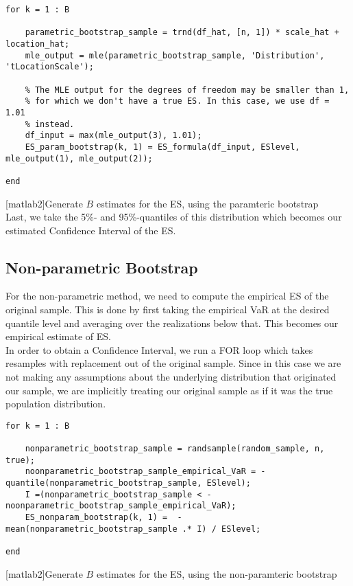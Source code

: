 \documentclass[11pt, a4paper]{article}
\begin{document}
\begin{lstlisting}[style=Matlab-editor]
for k = 1 : B

	parametric_bootstrap_sample = trnd(df_hat, [n, 1]) * scale_hat + location_hat;
	mle_output = mle(parametric_bootstrap_sample, 'Distribution', 'tLocationScale');
	
	% The MLE output for the degrees of freedom may be smaller than 1,     
	% for which we don't have a true ES. In this case, we use df = 1.01
	% instead.
	df_input = max(mle_output(3), 1.01);                                        
	ES_param_bootstrap(k, 1) = ES_formula(df_input, ESlevel, mle_output(1), mle_output(2));

end
\end{lstlisting}
\label{Parametric Bootstrap repetition}
[matlab2]{Generate $B$ estimates for the ES, using the paramteric bootstrap\\}
Last, we take the 5\%- and 95\%-quantiles of this distribution which becomes our estimated Confidence Interval of the ES.

\subsection{Non-parametric Bootstrap}

For the non-parametric method, we need to compute the empirical ES of the original sample. This is done by first taking the empirical VaR at the desired quantile level and averaging over the realizations below that. This becomes our empirical estimate of ES.\\

In order to obtain a Confidence Interval, we run a FOR loop which takes resamples with replacement out of the original sample. Since in this case we are not making any assumptions about the underlying distribution that originated our sample, we are implicitly treating our original sample as if it was the true population distribution.\\

\begin{lstlisting}[style=Matlab-editor]
for k = 1 : B

	nonparametric_bootstrap_sample = randsample(random_sample, n, true);
	noonparametric_bootstrap_sample_empirical_VaR = - quantile(nonparametric_bootstrap_sample, ESlevel);
	I =(nonparametric_bootstrap_sample < - noonparametric_bootstrap_sample_empirical_VaR);
	ES_nonparam_bootstrap(k, 1) =  - mean(nonparametric_bootstrap_sample .* I) / ESlevel;

end
\end{lstlisting}
\label{Non-parametric Bootstrap repetition}
[matlab2]{Generate $B$ estimates for the ES, using the non-paramteric bootstrap\\}
\end{document}
